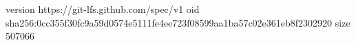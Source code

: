version https://git-lfs.github.com/spec/v1
oid sha256:0cc355f30fc9a59d0574e5111fe4ee723f08599aa1ba57c02e361eb8f2302920
size 507066
